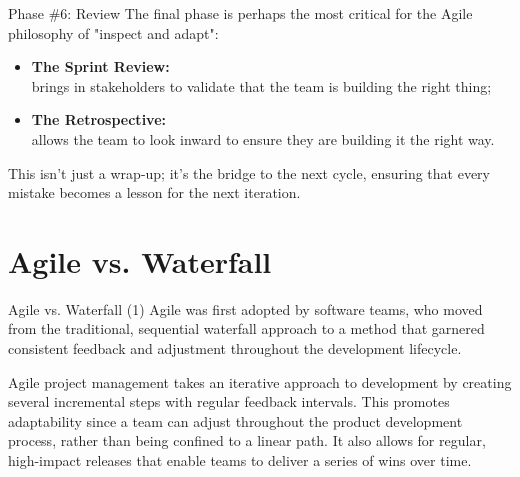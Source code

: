 \documentclass[
    notheorems,
    11pt,
    compress,
    aspectratio=169
]{beamer}
\begin{document}
\begin{frame}{Phase \#6: Review}
    The final phase is perhaps the most critical for the Agile philosophy of "inspect and adapt":

    \vspace{0.25cm}

    \begin{itemize}
        \item \textbf{The Sprint Review:}\\brings in stakeholders to validate that the team is building the right thing;

        \item \textbf{The Retrospective:}\\allows the team to look inward to ensure they are building it the right way.
    \end{itemize}

    \vspace{0.25cm}
    \pause

    \begin{block}{}
        This isn't just a wrap-up; it's the bridge to the next cycle, ensuring that every mistake becomes a lesson for the next iteration.
    \end{block}
\end{frame}


\section{Agile vs. Waterfall}

\begin{frame}{Agile vs. Waterfall (1)}
    Agile was first adopted by software teams, who moved from the traditional, sequential waterfall approach to a method that garnered consistent feedback and adjustment throughout the development lifecycle.

    \pause
    \vspace{0.5cm}

    Agile project management takes an iterative approach to development by creating several incremental steps with regular feedback intervals. This promotes adaptability since a team can adjust throughout the product development process, rather than being confined to a linear path. It also allows for regular, high-impact releases that enable teams to deliver a series of wins over time.
\end{frame}
\end{document}
